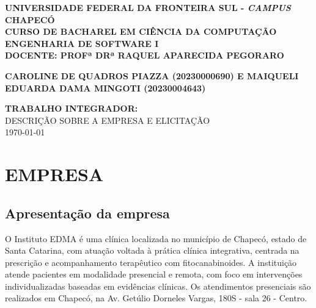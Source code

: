 \href{}{}\documentclass[12pt,portuguese,oneside]{article}
\begin{document}
\begin{center}
  \fontsize{12}{12}\selectfont\textbf{UNIVERSIDADE FEDERAL DA FRONTEIRA SUL - \textit{CAMPUS} CHAPECÓ \\
  CURSO DE BACHAREL EM CIÊNCIA DA COMPUTAÇÃO \\
  ENGENHARIA DE SOFTWARE I \\
  DOCENTE: PROFª DRª RAQUEL APARECIDA PEGORARO \\}
\end{center}

\begin{center}
  \vspace*{3cm}
  {\fontsize{12}{12}\selectfont\bfseries\uppercase{CAROLINE DE QUADROS PIAZZA (20230000690) E MAIQUELI EDUARDA DAMA MINGOTI (20230004643)}} \\
  \vspace{1cm} 
  \vfill
\end{center}

\begin{center}
  \vspace*{1cm}
  {\fontsize{12}{12}\selectfont\bfseries\uppercase{Trabalho Integrador:}} \\
  {\fontsize{12}{12}\selectfont\uppercase{Descrição sobre a empresa e Elicitação}} \\
  \vspace{8cm} 
\today
  \vfill
\end{center}


\newpage
{}
\renewcommand{\contentsname}{SUMÁRIO}
\renewcommand{\cfttoctitlefont}{\normalsize\bfseries}
\tableofcontents

\newpage

\section{EMPRESA}

\subsection{Apresentação da empresa}

\hspace{1em}O Instituto EDMA é uma clínica localizada no município de Chapecó, estado de Santa Catarina, com atuação voltada à prática clínica integrativa, centrada na prescrição e acompanhamento terapêutico com fitocanabinoides. A instituição atende pacientes em modalidade presencial e remota, com foco em intervenções individualizadas baseadas em evidências clínicas. Os atendimentos presenciais são realizados em Chapecó, na Av. Getúlio Dorneles Vargas, 180S - sala 26 - Centro.
\end{document}
